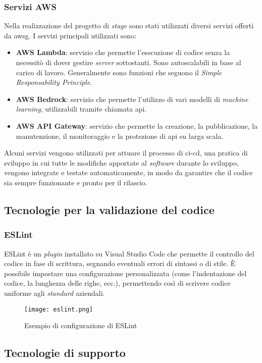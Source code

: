 \subsubsection {Servizi AWS}
Nella realizzazione del progetto di \textit{stage} sono stati utilizzati diversi servizi offerti da \gls{awsg}. I servizi principali utilizzati sono:
\begin{itemize}
    \item \textbf{AWS Lambda}: servizio che permette l'esecuzione di codice senza la necessitò di dover gestire \textit{server} sottostanti. Sono autoscalabili in base al carico di lavoro. Generalmente sono funzioni che seguono il \textit{Simple Responsability Principle}.
    \item \textbf{AWS Bedrock}: servizio che permette l'utilizzo di vari modelli di \textit{machine learning}, utilizzabili tramite chiamata \gls{api}.
    \item \textbf{AWS API Gateway}: servizio che permette la creazione, la pubblicazione, la manutenzione, il monitoraggio e la protezione di \gls{api} su larga scala.
\end{itemize}
Alcuni servizi vengono utilizzati per attuare il processo di \gls{ci-cd}, una pratica di sviluppo in cui tutte le modifiche apportate al \textit{software} durante lo sviluppo, vengono integrate e testate automaticamente, in modo da garantire che il codice sia sempre funzionante e pronto per il rilascio.
\subsection{Tecnologie per la validazione del codice}
\subsubsection{ESLint}
ESLint è un \textit{plugin} installato su Visual Studio Code che permette il controllo del codice in fase di scrittura, segnando eventuali errori di sintassi o di stile.
È possibile impostare una configurazione personalizzata (come l'indentazione del codice, la lunghezza delle righe, ecc.), permettendo così di scrivere codice uniforme agli \textit{standard} aziendali.
\begin{figure}[H]
    \centering
    \texttt{[image: eslint.png]}
    \caption{Esempio di configurazione di ESLint}
    \label{fig:ESlint}
\end{figure} 
\pagebreak
\subsection{Tecnologie di supporto}
